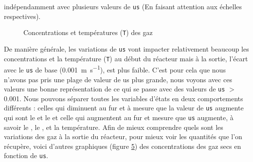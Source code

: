 \documentclass[11pt]{report}
\begin{document}
            indépendamment avec plusieurs valeurs de \verb|us| (En faisant attention aux échelles respectives).
            \begin{figure}[ht]
                \centering
                \begin{subfigure}[t]{0.325\textwidth}
                    \centering
                    
                    \caption{}
                    \label{graph:con:2:us:CH4}
                \end{subfigure}
                \hfill
                \begin{subfigure}[t]{0.325\textwidth}
                    \centering
                    
                    \caption{}
                    \label{graph:con:2:us:H2}
                \end{subfigure}
                \hfill
                \begin{subfigure}[t]{0.325\textwidth}
                    \centering
                    
                    \caption{}
                    \label{graph:con:2:us:CO}
                \end{subfigure}
                \hfill
                \begin{subfigure}[t]{0.325\textwidth}
                    \centering
                    
                    \caption{}
                    \label{graph:con:2:us:CO2}
                \end{subfigure}
                \caption{Concentrations et températures (\texttt{T}) des gaz}
                \label{graph:con:2:us}
            \end{figure}
            \par
            De manière générale, les variations de \verb|us| vont impacter relativement beaucoup 
            les concentrations et la température (\verb|T|) au début du réacteur mais à la sortie,
            l'écart avec le \verb|us| de base (\SI{0.001}{\meter\per\second}), est plus faible. C'est pour cela que 
            nous n'avons pas pris une plage de valeur de us plus grande, nous voyons avec 
            ces valeurs une bonne représentation de ce qui se passe avec des valeurs de 
            \verb|us| $>$ 0.001. Nous pouvons séparer toutes les variables d'états en deux comportements 
            différents : celles qui diminuent au fur et à mesure que la valeur de \verb|us| augmente
            qui sont le  et le  et celle qui augmentent au fur et mesure que \verb|us| augmente, 
            à savoir le , le , et la température.
            Afin de mieux comprendre quels sont les variations des gaz à la sortie du réacteur, 
            pour mieux voir les quantités que l'on récupère,
            voici d'autres graphiques (figure \ref{graph:con:2:us}) des concentrations des gaz secs en fonction de \verb|us|.
        
\end{document}
